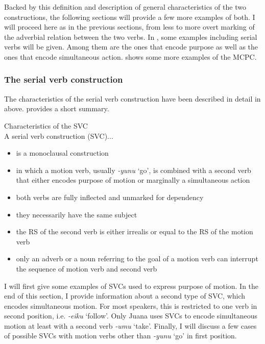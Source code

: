 Backed by this definition and description of general characteristics of the two constructions, the following sections will provide a few more examples of both. I will proceed here as in the previous sections, from less to more overt marking of the adverbial relation between the two verbs. In , some examples including serial verbs will be given. Among them are the ones that encode purpose as well as the ones that encode simultaneous action.   shows some more examples of the MCPC. 


\subsubsection{The serial verb construction}\label{sec:SerialVerbs}

The characteristics of the serial verb construction have been described in detail in  above.  provides a short summary.

\ea
\label{exfig:SVC}
\upshape
{Characteristics of the SVC}\\
A serial verb construction (SVC)... 
\begin{itemize}
\item is a monoclausal construction
\item in which a motion verb, usually \textit{-yunu} ‘go’, is combined with a second verb that either encodes purpose of motion or marginally a simultaneous action
\item both verbs are fully inflected and unmarked for dependency
\item they necessarily have the same subject
\item the RS of the second verb is either irrealis or equal to the RS of the motion verb
\item only an adverb or a noun referring to the goal of a motion verb can interrupt the sequence of motion verb and second verb
\end{itemize}
%
\z

I will first give some examples of SVCs used to express purpose of motion. In the end of this section, I provide information about a second type of SVC, which encodes simultaneous motion. For most speakers, this is restricted to one verb in second position, i.e. \textit{-eiku} ‘follow’. Only Juana uses SVCs to encode simultaneous motion at least with a second verb \textit{-umu} ‘take’. Finally, I will discuss a few cases of possible SVCs with motion verbs other than \textit{-yunu} ‘go’ in first position.

